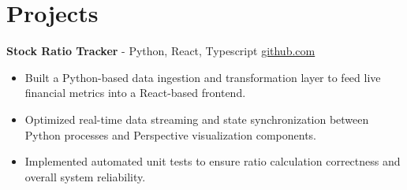 \documentclass[11pt]{article}       %
\begin{document}

\vspace{-18.5pt}

\section*{Projects}

\textbf{Stock Ratio Tracker}{ - Python, React, Typescript} \hfill \href{https://github.com/Monica20030707/Trading-Dashboard_UI}{github.com} \\
\vspace{-9pt}
\begin{itemize}
  \item Built a Python-based data ingestion and transformation layer to feed live financial metrics into a React-based frontend.
  \item Optimized real-time data streaming and state synchronization between Python processes and Perspective visualization components.
  \item Implemented automated unit tests to ensure ratio calculation correctness and overall system reliability.
\end{itemize}

\end{document}
